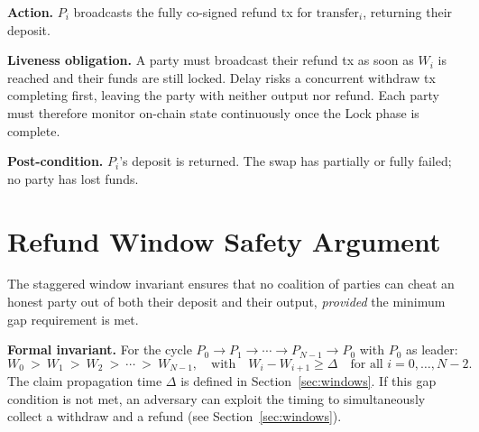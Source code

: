 \documentclass[11pt,a4paper,dvipsnames]{article}
\begin{document}
\noindent\textbf{Action.}\;
$P_i$ broadcasts the fully co-signed refund tx for $\mathrm{transfer}_i$,
returning their deposit.

\noindent\textbf{Liveness obligation.}\;
A party must broadcast their refund tx as soon as $W_i$ is reached and their
funds are still locked.
Delay risks a concurrent withdraw tx completing first, leaving the party with
neither output nor refund.
Each party must therefore monitor on-chain state continuously once the Lock
phase is complete.

\noindent\textbf{Post-condition.}\;
$P_i$'s deposit is returned.
The swap has partially or fully failed; no party has lost funds.

\section{Refund Window Safety Argument}

The staggered window invariant ensures that no coalition of parties can
cheat an honest party out of both their deposit and their output,
\emph{provided} the minimum gap requirement is met.

\medskip\noindent\textbf{Formal invariant.}\;
For the cycle $P_0 \to P_1 \to \cdots \to P_{N-1} \to P_0$ with $P_0$ as
leader:
\[
  W_0\ >\ W_1\ >\ W_2\ >\ \cdots\ >\ W_{N-1},
  \quad\text{with}\quad W_i - W_{i+1} \geq \Delta
  \quad\text{for all } i = 0, \ldots, N-2.
\]
The claim propagation time $\Delta$ is defined in Section~\ref{sec:windows}.
If this gap condition is not met, an adversary can exploit the timing to
simultaneously collect a withdraw and a refund (see Section~\ref{sec:windows}).
\end{document}
